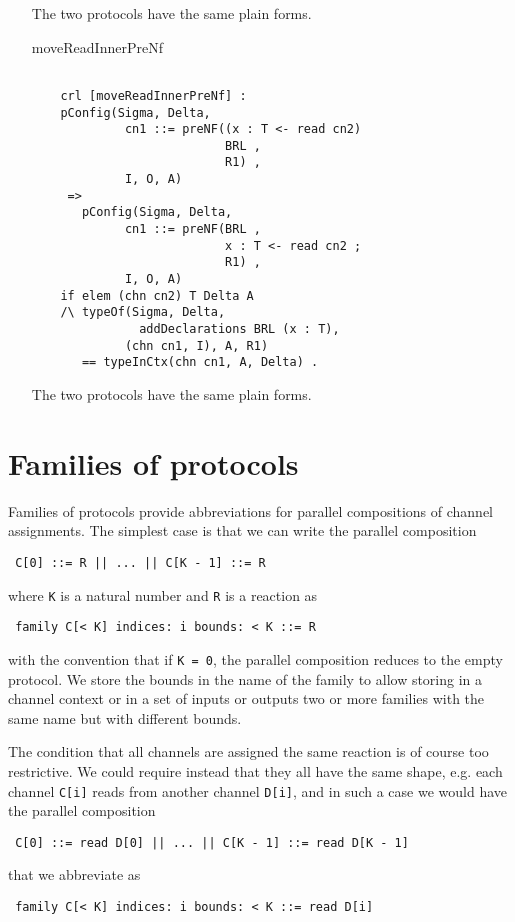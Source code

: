 \documentclass{article}
\begin{document}
\begin{itemize}
  The two protocols have the same plain forms.  

\item[moveReadInnerPreNf]
 \begin{lstlisting} 
  
    crl [moveReadInnerPreNf] :
    pConfig(Sigma, Delta,
             cn1 ::= preNF((x : T <- read cn2) 
                           BRL , 
                           R1) ,
             I, O, A)  
     => 
       pConfig(Sigma, Delta,
             cn1 ::= preNF(BRL , 
                           x : T <- read cn2 ; 
                           R1) ,
             I, O, A)  
    if elem (chn cn2) T Delta A 
    /\ typeOf(Sigma, Delta, 
               addDeclarations BRL (x : T), 
             (chn cn1, I), A, R1) 
       == typeInCtx(chn cn1, A, Delta) .
       \end{lstlisting}
       
    The two protocols have the same plain forms.  

\end{itemize}

\section{Families of protocols}

Families of protocols provide abbreviations for
parallel compositions of channel assignments.
The simplest case is that we can write the parallel composition
\begin{lstlisting}
 C[0] ::= R || ... || C[K - 1] ::= R
\end{lstlisting}
\noindent where \texttt{K} is a natural number and \texttt{R} is a reaction
as 
\begin{lstlisting}
 family C[< K] indices: i bounds: < K ::= R
\end{lstlisting}
\noindent with the convention that if \texttt{K = 0}, the parallel composition
reduces to the empty protocol. We store the bounds in the name of the family to allow storing in a channel context or in a set of inputs or outputs two or more families with the same name but with different bounds.

The condition that all channels are assigned the same reaction is of course too
restrictive. We could require instead that they all have the same shape, e.g.
each channel \texttt{C[i]} reads from another channel \texttt{D[i]}, 
and in such a case we would have the parallel composition
\begin{lstlisting}
 C[0] ::= read D[0] || ... || C[K - 1] ::= read D[K - 1]
\end{lstlisting}
\noindent that we abbreviate as 
\begin{lstlisting}
 family C[< K] indices: i bounds: < K ::= read D[i]
\end{lstlisting} 
\noindent
\end{document}
